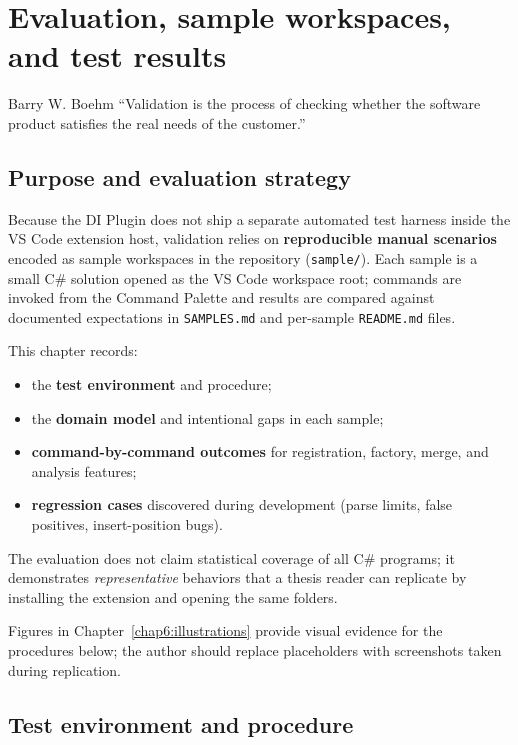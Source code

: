 \chapter[Evaluation]{Evaluation, sample workspaces, and test results}
\label{chap5:evaluation}
\begin{chapquote}{Barry W. Boehm}
``Validation is the process of checking whether the software product satisfies the real needs of the customer.''
\end{chapquote}

\section{Purpose and evaluation strategy}
\label{chap5:purpose}

Because the DI Plugin does not ship a separate automated test harness inside the VS Code extension host, validation relies on \textbf{reproducible manual scenarios} encoded as sample workspaces in the repository (\texttt{sample/}). Each sample is a small C\# solution opened as the VS Code workspace root; commands are invoked from the Command Palette and results are compared against documented expectations in \texttt{SAMPLES.md} and per-sample \texttt{README.md} files.

This chapter records:
\begin{itemize}
	\item the \textbf{test environment} and procedure;
	\item the \textbf{domain model} and intentional gaps in each sample;
	\item \textbf{command-by-command outcomes} for registration, factory, merge, and analysis features;
	\item \textbf{regression cases} discovered during development (parse limits, false positives, insert-position bugs).
\end{itemize}

The evaluation does not claim statistical coverage of all C\# programs; it demonstrates \emph{representative} behaviors that a thesis reader can replicate by installing the extension and opening the same folders.

Figures in Chapter~\ref{chap6:illustrations} provide visual evidence for the procedures below; the author should replace placeholders with screenshots taken during replication.

\section{Test environment and procedure}
\label{chap5:environment}

